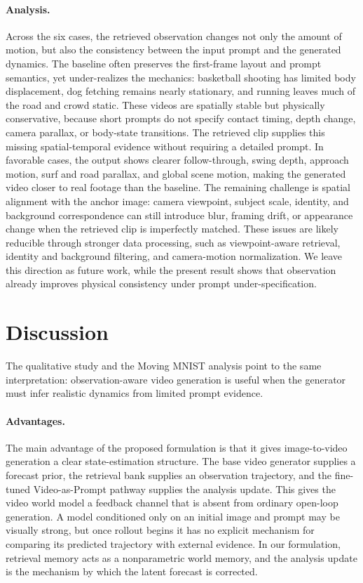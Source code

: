 \documentclass{article}
\begin{document}
\paragraph{Analysis.}
Across the six cases, the retrieved observation changes not only the amount of motion, but also the consistency between the input prompt and the generated dynamics. The baseline often preserves the first-frame layout and prompt semantics, yet under-realizes the mechanics: basketball shooting has limited body displacement, dog fetching remains nearly stationary, and running leaves much of the road and crowd static. These videos are spatially stable but physically conservative, because short prompts do not specify contact timing, depth change, camera parallax, or body-state transitions. The retrieved clip supplies this missing spatial-temporal evidence without requiring a detailed prompt. In favorable cases, the output shows clearer follow-through, swing depth, approach motion, surf and road parallax, and global scene motion, making the generated video closer to real footage than the baseline. The remaining challenge is spatial alignment with the anchor image: camera viewpoint, subject scale, identity, and background correspondence can still introduce blur, framing drift, or appearance change when the retrieved clip is imperfectly matched. These issues are likely reducible through stronger data processing, such as viewpoint-aware retrieval, identity and background filtering, and camera-motion normalization. We leave this direction as future work, while the present result shows that observation already improves physical consistency under prompt under-specification.

\section{Discussion}

The qualitative study and the Moving MNIST analysis point to the same interpretation: observation-aware video generation is useful when the generator must infer realistic dynamics from limited prompt evidence.

\paragraph{Advantages.}
The main advantage of the proposed formulation is that it gives image-to-video generation a clear state-estimation structure. The base video generator supplies a forecast prior, the retrieval bank supplies an observation trajectory, and the fine-tuned Video-as-Prompt pathway supplies the analysis update. This gives the video world model a feedback channel that is absent from ordinary open-loop generation. A model conditioned only on an initial image and prompt may be visually strong, but once rollout begins it has no explicit mechanism for comparing its predicted trajectory with external evidence. In our formulation, retrieval memory acts as a nonparametric world memory, and the analysis update is the mechanism by which the latent forecast is corrected.
\end{document}
